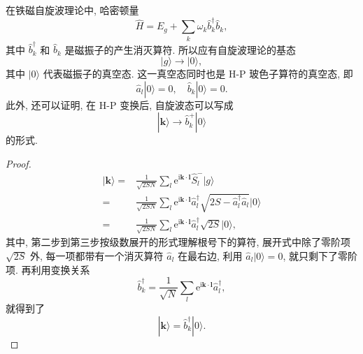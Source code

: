 \begin{note}
在铁磁自旋波理论中, 哈密顿量 
    \begin{equation}
        \hat{H}=E_g+\sum_{k}\omega_{k}\hat{b}_k^\dagger \hat{b}_k^{ },
    \end{equation}
    其中 $\hat{b}_k^\dagger$ 和 $\hat{b}_k^{ }$ 是磁振子的产生消灭算符. 所以应有自旋波理论的基态
    \begin{equation}
        |g\rangle\to |0\rangle,
    \end{equation}
    其中 $|0\rangle$ 代表磁振子的真空态. 这一真空态同时也是 H-P 玻色子算符的真空态, 即 
    \begin{equation}
        \hat{a}_l|0\rangle=0, \quad \hat{b}_{k}|0\rangle=0.
    \end{equation}
    此外, 还可以证明, 在 H-P 变换后, 自旋波态可以写成 
    \begin{equation}
        |\boldsymbol{k}\rangle\to \hat{b}^+_{k}|0\rangle
    \end{equation}
    的形式. 
    \begin{proof}
     \begin{align}
                |\boldsymbol{k}\rangle=&\frac{1}{\sqrt{2SN}}\sum_l\mathrm{e}^{\mathrm{i}\boldsymbol{k}\cdot \boldsymbol{l}}\hat{S}_l^-|g\rangle\nonumber\\
                =&\frac{1}{\sqrt{2SN}}\sum_l\mathrm{e}^{\mathrm{i}\boldsymbol{k}\cdot \boldsymbol{l}}\hat{a}_l^\dagger \sqrt{2S-\hat{a}^\dagger_l \hat{a}_l^{ }}|0\rangle\nonumber\\
                =&\frac{1}{\sqrt{2SN}}\sum_l\mathrm{e}^{\mathrm{i}\boldsymbol{k}\cdot \boldsymbol{l}}\hat{a}_l^\dagger \sqrt{2S}|0\rangle,
            \end{align}
        其中, 第二步到第三步按级数展开的形式理解根号下的算符, 展开式中除了零阶项 $\sqrt{2S}$ 外, 每一项都带有一个消灭算符 $\hat{a}_l$ 在最右边, 利用 $\hat{a}_l|0\rangle=0$, 就只剩下了零阶项. 再利用变换关系
        \begin{equation}
            \hat{b}^\dagger_{k}=\frac{1}{\sqrt{N}}\sum_l\mathrm{e}^{\mathrm{i}\boldsymbol{k}\cdot\boldsymbol{l}}\hat{a}_l^\dagger,
        \end{equation}
        就得到了
        \begin{equation}
            |\boldsymbol{k}\rangle=\hat{b}_{k}^\dagger |0\rangle.
        \end{equation}
    \end{proof}
\end{note}

